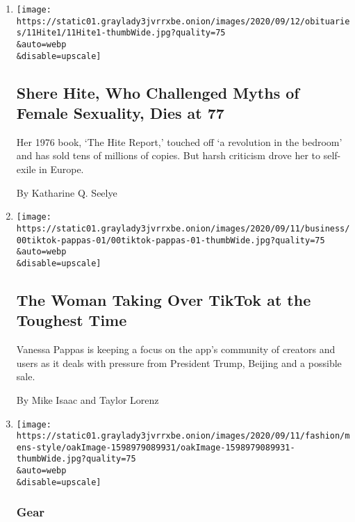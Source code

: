 \begin{enumerate}
\def\labelenumi{\arabic{enumi}.}
\item
  \href{/2020/09/11/books/shere-hite-dead.html}{}

  \texttt{[image: https://static01.graylady3jvrrxbe.onion/images/2020/09/12/obituaries/11Hite1/11Hite1-thumbWide.jpg?quality=75\\\&auto=webp\\\&disable=upscale]}

  \hypertarget{shere-hite-who-challenged-myths-of-female-sexuality-dies-at-77}{%
  \subsection{Shere Hite, Who Challenged Myths of Female Sexuality, Dies
  at
  77}\label{shere-hite-who-challenged-myths-of-female-sexuality-dies-at-77}}

  Her 1976 book, `The Hite Report,' touched off `a revolution in the
  bedroom' and has sold tens of millions of copies. But harsh criticism
  drove her to self-exile in Europe.

  By Katharine Q. Seelye
\item
  \href{/2020/09/11/technology/tiktok-vanessa-pappas-bytedance.html}{}

  \texttt{[image: https://static01.graylady3jvrrxbe.onion/images/2020/09/11/business/00tiktok-pappas-01/00tiktok-pappas-01-thumbWide.jpg?quality=75\\\&auto=webp\\\&disable=upscale]}

  \hypertarget{the-woman-taking-over-tiktok-at-the-toughest-time-1}{%
  \subsection{The Woman Taking Over TikTok at the Toughest
  Time}\label{the-woman-taking-over-tiktok-at-the-toughest-time-1}}

  Vanessa Pappas is keeping a focus on the app's community of creators
  and users as it deals with pressure from President Trump, Beijing and
  a possible sale.

  By Mike Isaac and Taylor Lorenz
\item
  \href{/2020/09/11/fashion/mens-style/how-to-stay-toasty-outdoors-this-fall.html}{}

  \texttt{[image: https://static01.graylady3jvrrxbe.onion/images/2020/09/11/fashion/mens-style/oakImage-1598979089931/oakImage-1598979089931-thumbWide.jpg?quality=75\\\&auto=webp\\\&disable=upscale]}

  \hypertarget{gear-1}{%
  \subsubsection{Gear}\label{gear-1}}


\end{enumerate}
